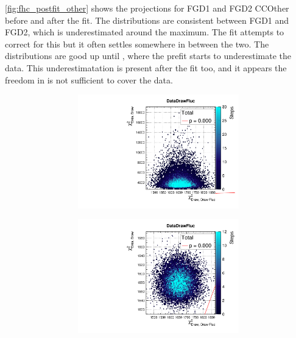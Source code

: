 \autoref{fig:fhc_postfit_other} shows the projections for FGD1 and FGD2 CCOther before and after the fit. The \pmu distributions are consistent between FGD1 and FGD2, which is underestimated around the maximum. The fit attempts to correct for this but it often settles somewhere in between the two. The \cosmu distributions are good up until , where the prefit starts to underestimate the data. This underestimatation is present after the fit too, and it appears the freedom in \cosmu is not sufficient to cover the data. 
\begin{figure}[h]
\begin{subfigure}[t]{\textwidth}
\begin{subfigure}[t]{0.24\textwidth}
	\includegraphics[width=\textwidth, trim={0mm 0mm 0mm 8mm}, clip,page=28]{figures/mach3/data/priorpred/2017b_NewDet_3Xsec_4Det_5Flux_NewXSecTune_Data_merge_PriorPred_procs}
\end{subfigure}
\begin{subfigure}[t]{0.24\textwidth}
	\includegraphics[width=\textwidth, trim={0mm 0mm 0mm 8mm}, clip,page=28]{figures/mach3/data/postpred/2017b_NewData_NewDet_UpdXsecStep_2Xsec_4Det_5Flux_0_PostPred_procs}

\end{subfigure}
\end{subfigure}
\end{figure}
